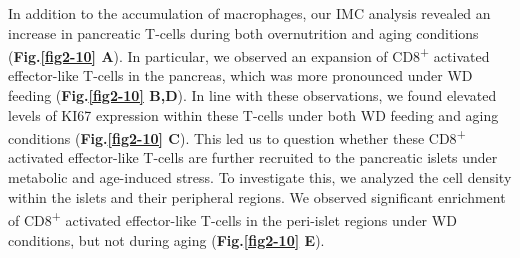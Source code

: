 In addition to the accumulation of macrophages, our IMC analysis revealed an increase in pancreatic T-cells during both overnutrition and aging conditions (\textbf{Fig.\ref{fig2-10} A}). In particular, we observed an expansion of CD8\textsuperscript{+} activated effector-like T-cells in the pancreas, which was more pronounced under WD feeding (\textbf{Fig.\ref{fig2-10} B,D}). In line with these observations, we found elevated levels of KI67 expression within these T-cells under both WD feeding and aging conditions (\textbf{Fig.\ref{fig2-10} C}). This led us to question whether these CD8\textsuperscript{+} activated effector-like T-cells are further recruited to the pancreatic islets under metabolic and age-induced stress. To investigate this, we analyzed the cell density within the islets and their peripheral regions. We observed significant enrichment of CD8\textsuperscript{+} activated effector-like T-cells in the peri-islet regions under WD conditions, but not during aging (\textbf{Fig.\ref{fig2-10} E}).\\\\

